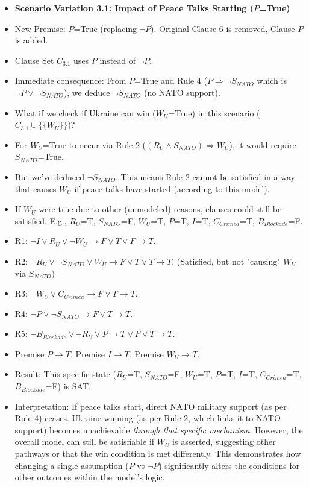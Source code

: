 \documentclass[11pt, a4paper]{article}
\begin{document}
\begin{itemize}
    \item \textbf{Scenario Variation 3.1: Impact of Peace Talks Starting ($P$=True)}
        \item New Premise: $P$=True (replacing $\neg P$). Original Clause 6 is removed, Clause $P$ is added.
        \item Clause Set $C_{3.1}$ uses $P$ instead of $\neg P$.
        \item Immediate consequence: From $P$=True and Rule 4 ($P \Rightarrow \neg S_{NATO}$ which is $\neg P \vee \neg S_{NATO}$), we deduce $\neg S_{NATO}$ (no NATO support).
        \item What if we check if Ukraine can win ($W_U$=True) in this scenario ($C_{3.1} \cup \{\{W_U\}\}$)?
            \item For $W_U$=True to occur via Rule 2 ($(R_U \wedge S_{NATO}) \Rightarrow W_U$), it would require $S_{NATO}$=True.
            \item But we've deduced $\neg S_{NATO}$. This means Rule 2 cannot be satisfied in a way that causes $W_U$ if peace talks have started (according to this model).
            \item If $W_U$ were true due to other (unmodeled) reasons, clauses could still be satisfied. E.g., $R_U$=T, $S_{NATO}$=F, $W_U$=T, $P$=T, $I$=T, $C_{Crimea}$=T, $B_{Blockade}$=F.
                \item R1: $\neg I \vee R_U \vee \neg W_U \rightarrow F \vee T \vee F \rightarrow T$.
                \item R2: $\neg R_U \vee \neg S_{NATO} \vee W_U \rightarrow F \vee T \vee T \rightarrow T$. (Satisfied, but not "causing" $W_U$ via $S_{NATO}$)
                \item R3: $\neg W_U \vee C_{Crimea} \rightarrow F \vee T \rightarrow T$.
                \item R4: $\neg P \vee \neg S_{NATO} \rightarrow F \vee T \rightarrow T$.
                \item R5: $\neg B_{Blockade} \vee \neg R_U \vee P \rightarrow T \vee F \vee T \rightarrow T$.
                \item Premise $P \rightarrow T$. Premise $I \rightarrow T$. Premise $W_U \rightarrow T$.
            \item Result: This specific state ($R_U$=T, $S_{NATO}$=F, $W_U$=T, $P$=T, $I$=T, $C_{Crimea}$=T, $B_{Blockade}$=F) is SAT.
        \item Interpretation: If peace talks start, direct NATO military support (as per Rule 4) ceases. Ukraine winning (as per Rule 2, which links it to NATO support) becomes unachievable \textit{through that specific mechanism}. However, the overall model can still be satisfiable if $W_U$ is asserted, suggesting other pathways or that the win condition is met differently. This demonstrates how changing a single assumption ($P$ vs $\neg P$) significantly alters the conditions for other outcomes within the model's logic.


\end{itemize}
\end{document}
